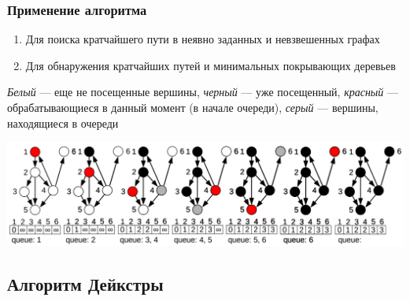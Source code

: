 \documentclass[a4paper]{article}
\begin{document}
\subsubsection*{Применение алгоритма}
\begin{enumerate}
    \item Для поиска кратчайшего пути в неявно заданных и невзвешенных графах
    \item Для обнаружения кратчайших путей и минимальных покрывающих деревьев
\end{enumerate}
\indent \textit{Белый} — еще не посещенные вершины, \textit{черный} — уже посещенный, \textit{красный} — обрабатывающиеся в данный момент (в начале очереди), \textit{серый} — вершины, находящиеся в очереди
\begin{center}
    \includegraphics[width=1\linewidth]{bfs.png}
    \label{bfs}
\end{center}

\subsection{Алгоритм Дейкстры}
\end{document}

